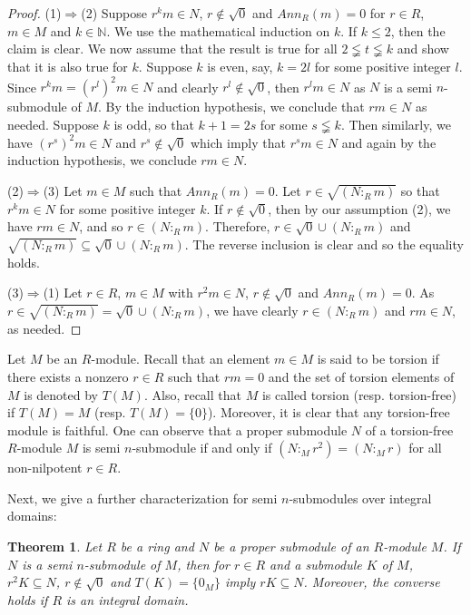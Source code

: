 \documentclass{amsart}%
\providecommand{\U}[1]{\protect\rule{.1in}{.1in}}
\newtheorem{theorem}{Theorem}
\theoremstyle{plain}
\numberwithin{equation}{section}
\begin{document}
\begin{proof}
(1)$\Rightarrow$(2) Suppose $r^{k}m\in N$, $r\notin\sqrt{0}$ and
$Ann_{R}(m)=0$ for $r\in R$, $m\in M$ and $k\in%
\mathbb{N}
$. We use the mathematical induction on $k$. If $k\leq2$, then the claim is
clear. We now assume that the result is true for all $2\lneqq t\lneqq k$ and
show that it is also true for $k.$ Suppose $k$ is even, say, $k=2l$ for some
positive integer $l.$ Since $r^{k}m=(r^{l})^{2}m\in N$ and clearly
$r^{l}\notin\sqrt{0}$, then $r^{l}m\in N$ as $N$ is a semi $n$-submodule of
$M$. By the induction hypothesis, we conclude that $rm\in N$ as needed.
Suppose $k$ is odd, so that $k+1=2s$ for some $s\lneqq k$. Then similarly, we
have $\left(  r^{s}\right)  ^{2}m\in N$ and $r^{s}\notin\sqrt{0}$ which imply
that $r^{s}m\in N$ and again by the induction hypothesis, we conclude $rm\in
N$.

(2)$\Rightarrow$(3) Let $m\in M$ such that $Ann_{R}(m)=0$. Let $r\in
\sqrt{(N:_{R}m)}$ so that $r^{k}m\in N$ for some positive integer $k.$ If
$r\notin\sqrt{0}$, then by our assumption (2), we have $rm\in N$, and so
$r\in(N:_{R}m).$ Therefore, $r\in\sqrt{0}\cup(N:_{R}m)$ and $\sqrt{(N:_{R}%
m)}\subseteq\sqrt{0}\cup(N:_{R}m)$. The reverse inclusion is clear and so the
equality holds.

(3)$\Rightarrow$(1) Let $r\in R$, $m\in M$ with $r^{2}m\in N$, $r\notin
\sqrt{0}$ and $Ann_{R}(m)=0$. As $r\in\sqrt{(N:_{R}m)}=\sqrt{0}\cup(N:_{R}m)$,
we have clearly $r\in(N:_{R}m)$ and $rm\in N$, as needed.
\end{proof}

Let $M$ be an $R$-module. Recall that an element $m\in M$ is said to be
torsion if there exists a nonzero $r\in R$ such that $rm=0$ and the set of
torsion elements of $M$ is denoted by $T(M).$ Also, recall that $M$ is called
torsion (resp. torsion-free) if $T(M)=M$ (resp. $T(M)=\{0\}$). Moreover, it is
clear that any torsion-free module is faithful. One can observe that a proper
submodule $N$ of a torsion-free $R$-module $M$ is semi $n$-submodule if and
only if $(N:_{M}r^{2})=(N:_{M}r)$ for all non-nilpotent $r\in R$.

Next, we give a further characterization for semi $n$-submodules over integral domains:

\begin{theorem}
\label{char}Let $R$ be a ring and $N$ be a proper submodule of an $R$-module
$M$. If $N$ is a semi $n$-submodule of $M$, then for $r\in R$ and a submodule
$K$ of $M$, $r^{2}K\subseteq N$, $r\notin\sqrt{0}$ and $T(K)=\{0_{M}\}$ imply
$rK\subseteq N$. Moreover, the converse holds if $R$ is an integral domain.
\end{theorem}
\end{document}
